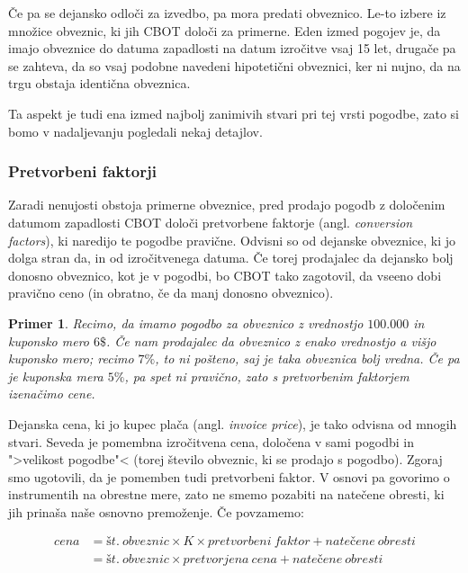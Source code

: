 \documentclass[a4paper, 11pt]{article}
\newtheorem{primer}{Primer}
\begin{document}
Če pa se dejansko odloči za izvedbo, pa mora predati obveznico. Le-to izbere iz množice obveznic, ki jih
CBOT določi za primerne. Eden izmed pogojev je, da imajo obveznice do datuma zapadlosti na datum izročitve
vsaj 15 let, drugače pa se zahteva, da so vsaj podobne navedeni hipotetični obveznici, ker ni nujno, da na
trgu obstaja identična obveznica. 

Ta aspekt je tudi ena izmed najbolj zanimivih stvari pri tej vrsti pogodbe, zato si bomo v nadaljevanju 
pogledali nekaj detajlov.


\subsubsection{Pretvorbeni faktorji}
Zaradi nenujosti obstoja primerne obveznice, pred prodajo pogodb z določenim datumom zapadlosti CBOT 
določi pretvorbene faktorje (angl. \textit{conversion factors}), ki naredijo te pogodbe pravične. 
Odvisni so od dejanske obveznice, ki jo dolga stran da, in od izročitvenega datuma. Če torej prodajalec
da dejansko bolj donosno obveznico, kot je v pogodbi, bo CBOT tako zagotovil, da vseeno dobi pravično
ceno (in obratno, če da manj donosno obveznico).

\begin{primer}
    Recimo, da imamo pogodbo za obveznico z vrednostjo \textdollar$100.000$ in kuponsko mero $6\$$. 
    Če nam prodajalec da obveznico z enako vrednostjo a višjo kuponsko mero; recimo $7\%$, to ni 
    pošteno, saj je taka obveznica bolj vredna. Če pa je kuponska mera $5\%$, pa spet ni pravično, 
    zato s pretvorbenim faktorjem izenačimo cene.
\end{primer}

Dejanska cena, ki jo kupec plača (angl. \textit{invoice price}), je tako odvisna od mnogih stvari. 
Seveda je pomembna izročitvena cena, določena v sami pogodbi in ">velikost pogodbe"< (torej število
obveznic, ki se prodajo s pogodbo). Zgoraj smo ugotovili, da je pomemben tudi pretvorbeni faktor. 
V osnovi pa govorimo o instrumentih na obrestne mere, zato ne smemo pozabiti na natečene obresti, 
ki jih prinaša naše osnovno premoženje. Če povzamemo:

\begin{align*}
    cena 
    &= št.\:obveznic \times K \times pretvorbeni\:faktor + natečene\:obresti \\
    &= št.\:obveznic \times pretvorjena\:cena + natečene\:obresti
\end{align*}
\end{document}
